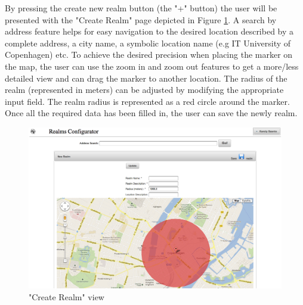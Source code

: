 \noindent By pressing the create new realm button (the "+" button) the user will be presented with the "Create Realm" page depicted in Figure \ref{fig.new_realm}. A search by address feature helps for easy navigation to the desired location described by a complete address, a city name, a symbolic location name (e.g IT University of Copenhagen) etc. To achieve the desired precision when placing the marker on the map, the user can use the zoom in and zoom out features to get a more/less detailed view and can drag the marker to another location. The radius of the realm (represented in meters) can be adjusted by modifying the appropriate input field. The realm radius is represented as a red circle around the marker. Once all the required data has been filled in, the user can save the newly realm.
\begin{figure}[H] 
	\centering
	\includegraphics[width=\linewidth]{fig/new_realm.png}
	\caption{"Create Realm" view}
	\label{fig.new_realm}
\end{figure}
\\

